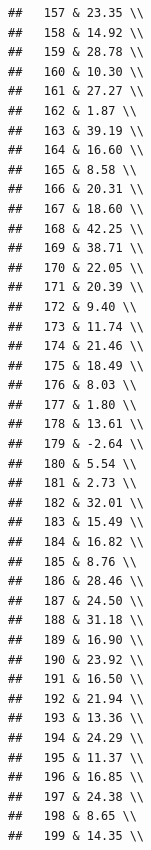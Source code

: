 \documentclass{article}\usepackage[]{graphicx}\usepackage[]{color}
\makeatletter
\newenvironment{kframe}{%
 \def\at@end@of@kframe{}%
 \ifinner\ifhmode%
  \def\at@end@of@kframe{\end{minipage}}%
  \begin{minipage}{\columnwidth}%
 \fi\fi%
 \def\FrameCommand##1{\hskip\@totalleftmargin \hskip-\fboxsep
 \colorbox{shadecolor}{##1}\hskip-\fboxsep
     \hskip-\linewidth \hskip-\@totalleftmargin \hskip\columnwidth}%
 \MakeFramed {\advance\hsize-\width
   \@totalleftmargin\z@ \linewidth\hsize
   \@setminipage}}%
 {\par\unskip\endMakeFramed%
 \at@end@of@kframe}
\newenvironment{knitrout}{}{} %
\makeatother
\begin{document}
\begin{knitrout}
\begin{kframe}
\begin{verbatim}
##   157 & 23.35 \\ 
##   158 & 14.92 \\ 
##   159 & 28.78 \\ 
##   160 & 10.30 \\ 
##   161 & 27.27 \\ 
##   162 & 1.87 \\ 
##   163 & 39.19 \\ 
##   164 & 16.60 \\ 
##   165 & 8.58 \\ 
##   166 & 20.31 \\ 
##   167 & 18.60 \\ 
##   168 & 42.25 \\ 
##   169 & 38.71 \\ 
##   170 & 22.05 \\ 
##   171 & 20.39 \\ 
##   172 & 9.40 \\ 
##   173 & 11.74 \\ 
##   174 & 21.46 \\ 
##   175 & 18.49 \\ 
##   176 & 8.03 \\ 
##   177 & 1.80 \\ 
##   178 & 13.61 \\ 
##   179 & -2.64 \\ 
##   180 & 5.54 \\ 
##   181 & 2.73 \\ 
##   182 & 32.01 \\ 
##   183 & 15.49 \\ 
##   184 & 16.82 \\ 
##   185 & 8.76 \\ 
##   186 & 28.46 \\ 
##   187 & 24.50 \\ 
##   188 & 31.18 \\ 
##   189 & 16.90 \\ 
##   190 & 23.92 \\ 
##   191 & 16.50 \\ 
##   192 & 21.94 \\ 
##   193 & 13.36 \\ 
##   194 & 24.29 \\ 
##   195 & 11.37 \\ 
##   196 & 16.85 \\ 
##   197 & 24.38 \\ 
##   198 & 8.65 \\ 
##   199 & 14.35 \\ 

\end{verbatim}
\end{kframe}
\end{knitrout}
\end{document}
